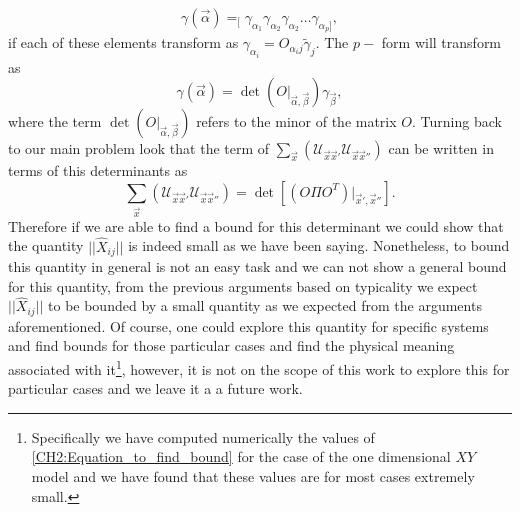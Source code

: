 \begin{equation}
\gamma(\vec{\alpha}) =_{[}\gamma_{\alpha_1}\gamma_{\alpha_2}\gamma_{\alpha_2}\ldots\gamma_{\alpha_p]},
\end{equation}
if each of these elements transform as $\gamma_{\alpha_i} = O_{\alpha_i j} \tilde{\gamma}_{j}$. The $p-$ form will transform as
\begin{equation}
\gamma(\vec{\alpha}) = \operatorname{det}\left(O\big|_{\vec{\alpha},\vec{\beta}}\right)\gamma_{\vec{\beta}},
\label{CH2:transformations_of_operators}
\end{equation}
where the term $\operatorname{det}\left(O\big|_{\vec{\alpha},\vec{\beta}}\right)$ refers to the minor of the matrix $O$. Turning back to our main problem look that the term of $\sum_{\vec{x}}\left(	\mathcal{U}_{\vec{x}\vec{x}'} \mathcal{U}_{\vec{x}\vec{x}''}\right)$ can be written in terms of this determinants as
\begin{equation}
\sum_{\vec{x}}\left(	\mathcal{U}_{\vec{x}\vec{x}'} \mathcal{U}_{\vec{x}\vec{x}''}\right) = \operatorname{det}\left[\left(O\Pi O^T\right)\big|_{\vec{x}',\vec{x}''}\right].
\label{CH2:Equation_to_find_bound}
\end{equation}
\indent Therefore if we are able to find a bound for this determinant we could show that the quantity $||\hat{X}_{ij}||$ is indeed small as we have been saying. Nonetheless, to bound this quantity in general is not an easy task and we can not show a general bound for this quantity, from the previous arguments based on typicality we expect $||\hat{X}_{ij}||$ to be bounded by a small quantity as we expected from the arguments aforementioned. Of course, one could explore this quantity for specific systems and find bounds for those particular cases and find the physical meaning associated with it\footnote{Specifically we have computed numerically the values of  \eqref{CH2:Equation_to_find_bound} for the case of the one dimensional $XY$ model and we have found that these values are for most cases extremely small.}, however, it is not on the scope of this work to explore this for particular cases and we leave it a a future work.






